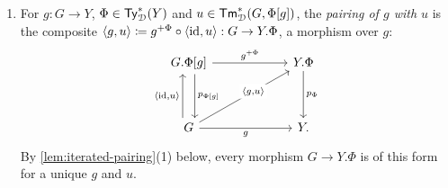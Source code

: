 \begin{definition}
\begin{enumerate}
\[\begin{tikzcd}
            \arrow["g"', from=1-1, to=2-1]
            \arrow["{g^{+\Phi}}", from=1-2, to=2-2]
            \arrow["{\langle \id, u \rangle}"', from=2-1, to=2-2]
        \end{tikzcd}\]
        commutes. The square for $u$ makes the clause for $(u, a)$ well typed, since $a[g]$ is a term of $A[\langle \id, u \rangle \circ g] = A[g^{+\Phi}][\langle \id, u[g] \rangle]$; and the square for $(u, a)$ commutes since
        \begin{align*}
            g^{+(\Phi, A)} \circ \langle \id, (u, a)[g] \rangle &= (h^{+\Phi})^{+A} \circ \big\langle \langle \id, u[g] \rangle, a[g] \big\rangle\\
            &= \big\langle g^{+\Phi} \circ \langle \id, u[h] \rangle, a[h] \big\rangle = \big\langle \langle \id, u \rangle \circ g, a[g] \big\rangle\\
            &= \big\langle \langle \id, u \rangle, a \big\rangle \circ g = \langle \id, (u, a) \rangle \circ g,
        \end{align*}
        by the definitions, the square for $u$ and \cref{lem:pairing}(2).
        \item For $g : G \to Y$, $\Phi \in \mathsf{Ty}^*_{\mathcal{D}}(Y)$ and $u \in \mathsf{Tm}^*_{\mathcal{D}}(G, \Phi[g])$, the \emph{pairing of $g$ with $u$} is the composite $\langle g, u \rangle \coloneqq g^{+\Phi} \circ \langle \mathrm{id}, u \rangle : G \to Y.\Phi$, a morphism over $g$:
        \[\begin{tikzcd}[column sep=6em, row sep=3.5em]
            {G.\Phi[g]} & {Y.\Phi} \\
            G & Y.
            \arrow["{g^{+\Phi}}", from=1-1, to=1-2]
            \arrow["{p_{\Phi[g]}}", shift left=2, from=1-1, to=2-1]
            \arrow["{p_\Phi}", from=1-2, to=2-2]
            \arrow["{\langle \id, u \rangle}", shift left=2, from=2-1, to=1-1]
            \arrow["{\langle g, u \rangle}"{description, pos=0.6}, from=2-1, to=1-2]
            \arrow["g"', from=2-1, to=2-2]
        \end{tikzcd}\]
        By \cref{lem:iterated-pairing}(1) below, every morphism $G \to Y.\Phi$ is of this form for a unique $g$ and $u$.
    \end{enumerate}
\end{definition}

